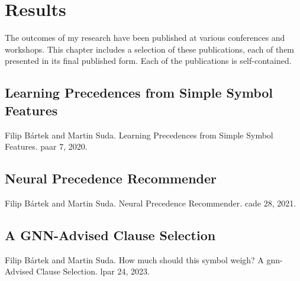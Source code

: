 \newcommand*{\IncludePaper}[2][]{}

\chapter{Results}

The outcomes of my research have been published at various conferences and workshops.
This chapter includes a selection of these publications, each of them presented in its final published form.
Each of the publications is self-contained.


\section{Learning Precedences from Simple Symbol Features}
\label{sec:results:simple}

Filip Bártek and Martin Suda.
Learning Precedences from Simple Symbol Features.
\Acrlong{paar} 7, 2020.
\cite{DBLP:conf/cade/Bartek020}

\IncludePaper{publications/simple.pdf}

\section{Neural Precedence Recommender}
\label{sec:results:npr}

Filip Bártek and Martin Suda.
Neural Precedence Recommender.
\Acrlong{cade} 28, 2021.
\cite{DBLP:conf/cade/Bartek021}

\IncludePaper{publications/Neural Precedence Recommender.pdf}

\section{A GNN-Advised Clause Selection}
\label{sec:results:selection}

Filip Bártek and Martin Suda.
How much should this symbol weigh? A \acrshort{gnn}-Advised Clause Selection.
\Acrlong{lpar} 24, 2023.
\cite{DBLP:conf/lpar/Bartek023}


